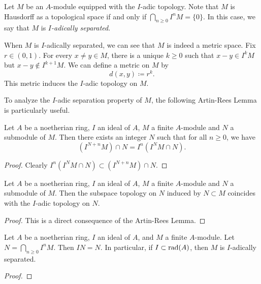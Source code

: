     Let \(M\) be an \(A\)-module equipped with the \(I\)-adic topology.
    Note that \(M\) is Hausdorff as a topological space if and only if \(\bigcap_{n \geq 0} I^nM = \{0\}\).
    In this case, we say that \(M\) is \emph{\(I\)-adically separated}.
    
    When \(M\) is \(I\)-adically separated, we can see that \(M\) is indeed a metric space.
    Fix \(r \in (0,1)\). 
    For every \(x\neq y \in M\), there is a unique \(k \geq 0\) such that \(x - y \in I^kM\) but \(x - y \notin I^{k+1}M\).
    We can define a metric on \(M\) by
    \[ d(x, y) \coloneqq r^k. \]
    This metric induces the \(I\)-adic topology on \(M\).
    
    To analyze the \(I\)-adic separation property of \(M\), the following Artin-Rees Lemma is particularly useful.

    \begin{theorem}\label{thm: Artin Rees Lemma}
        Let \(A\) be a noetherian ring, \(I\) an ideal of \(A\), \(M\) a finite \(A\)-module and \(N\) a submodule of \(M\). 
        Then there exists an integer \(N\) such that for all \(n \geq 0\), we have
        \[ (I^{N+n}M) \cap N = I^n (I^N M \cap N). \]
    \end{theorem}
    \begin{proof}
        Clearly \(I^n(I^N M \cap N) \subset (I^{N+n}M) \cap N\).
    \end{proof}

    \begin{corollary}\label{cor: subspace topology coincides with I-adic topology}
        Let \(A\) be a noetherian ring, \(I\) an ideal of \(A\), \(M\) a finite \(A\)-module and \(N\) a submodule of \(M\).
        Then the subspace topology on \(N\) induced by \(N \subset M\) coincides with the \(I\)-adic topology on \(N\).
    \end{corollary}
    \begin{proof}
        This is a direct consequence of the Artin-Rees Lemma.
    \end{proof}

    \begin{corollary}\label{cor: finite module over noetherian ring is I-adically separated}
        Let \(A\) be a noetherian ring, \(I\) an ideal of \(A\), and \(M\) a finite \(A\)-module. 
        Let \(N = \bigcap_{n \geq 0} I^n M\).
        Then \(I N = N\).
        In particular, if \(I \subset \operatorname{rad}(A)\), then \(M\) is \(I\)-adically separated.
    \end{corollary}
    \begin{proof}
    \end{proof}

